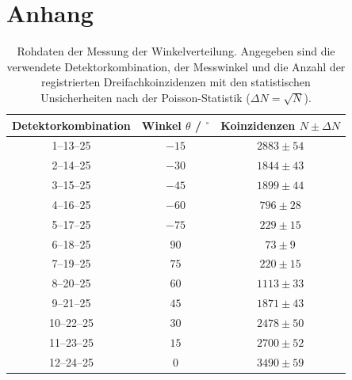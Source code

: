 \chapter{Anhang}

\begin{table}[H]
    \centering
    \caption{Rohdaten der Messung der Winkelverteilung. Angegeben sind die verwendete Detektorkombination, der Messwinkel und die Anzahl der registrierten Dreifachkoinzidenzen mit den statistischen Unsicherheiten nach der Poisson-Statistik ($\Delta N=\sqrt{N}$).}
    \label{tab:roh_winkel}
    \begin{tabular}{ccc}
        \toprule
        Detektorkombination & Winkel $\theta$ / $^\circ$ & Koinzidenzen $N \pm \Delta N$ \\
        \midrule
        1--13--25  & $-15$ & $2883 \pm 54$ \\
        2--14--25  & $-30$ & $1844 \pm 43$ \\
        3--15--25  & $-45$ & $1899 \pm 44$ \\
        4--16--25  & $-60$ & $796 \pm 28$ \\
        5--17--25  & $-75$ & $229 \pm 15$ \\
        6--18--25  & $90$  & $73 \pm 9$ \\
        7--19--25  & $75$  & $220 \pm 15$ \\
        8--20--25  & $60$  & $1113 \pm 33$ \\
        9--21--25  & $45$  & $1871 \pm 43$ \\
        10--22--25 & $30$  & $2478 \pm 50$ \\
        11--23--25 & $15$  & $2700 \pm 52$ \\
        12--24--25 & $0$   & $3490 \pm 59$ \\
        \bottomrule
    \end{tabular}
\end{table}

